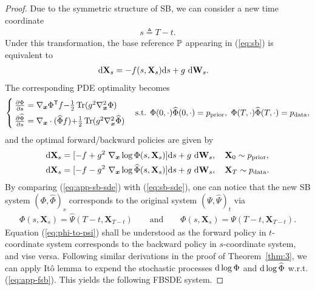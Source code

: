 \documentclass{article}
\def\eqref#1{(\ref{#1})}
\def\rd{{\textnormal{d}}}
\def\rvX{{\mathbf{X}}}
\def\vx{{\bm{x}}}
\newcommand{\pdata}{p_{\rm{data}}}
\DeclareMathOperator{\Tr}{Tr}
\def\ws{{ \mathbf{W}_s }}
\def\dws{{ \mathrm{d} \ws }}
\def\ds{{ \mathrm{d} s }}
\newcommand{\fracpartial}[2]{\frac{\partial #1}{\partial  #2}}
\newcommand{\T}{\mathsf{T}}
\begin{document}
\begin{proof}
  Due to the symmetric structure of SB, we can consider a new time coordinate
  \begin{align*}
    s \triangleq T - t.
  \end{align*}
  Under this transformation, the base reference ${\mathbb{P}}$ appearing in \eqref{eq:sb} is equivalent to
  \begin{align*}
    \rd \rvX_s &= - f(s, \rvX_s) \ds + g~\dws.
  \end{align*}
  The corresponding PDE optimality becomes
  \begin{align}
      \begin{cases}
      \fracpartial{\Phi}{s} = \nabla_\vx \Phi^\T f {-} \frac{1}{2} \Tr(g^2\nabla^2_{\vx}\Phi) \\[3pt]
      \fracpartial{\widehat{\Phi}}{s} = \nabla_\vx \cdot (\widehat{\Phi} f) {+} \frac{1}{2} \Tr(g^2\nabla^2_{\vx}\widehat{\Phi})
      \end{cases}
      \text{s.t. } \Phi(0,\cdot) \widehat{\Phi}(0,\cdot) = \prior,~\Phi(T,\cdot) \widehat{\Phi}(T,\cdot) = \pdata,
  \end{align}
  and the optimal forward/backward policies are given by
  \begin{subequations}
  \begin{align}
      \rd \rvX_s &= [-f + g^2~\nabla_\vx \log {\Phi}(s,\rvX_s)] \ds + g~\dws,
      \quad \rvX_0 \sim \prior,
      \label{eq:app-fsb}
      \\
      \rd \rvX_s &= [- f - g^2~\nabla_\vx \log \widehat{\Phi}(s,\rvX_s)] \ds + g~\dws,
      \quad \rvX_T \sim \pdata.
      \label{eq:app-bsb}
  \end{align} \label{eq:app-sb-sde}\end{subequations}
  By comparing \eqref{eq:app-sb-sde} with \eqref{eq:sb-sde},
  one can notice that the new SB system $(\Phi, \widehat{\Phi})_s$ corresponds to the original system
  $(\Psi, \widehat{\Psi})_t$ via
  \begin{align}
    \Phi(s, \rvX_s) = \widehat{\Psi}(T-t, \rvX_{T-t}) \qquad \text{and} \qquad
    \widehat{\Phi}(s, \rvX_s) = {\Psi}(T-t, \rvX_{T-t}).
    \label{eq:phi-to-psi}
  \end{align}
  Equation \eqref{eq:phi-to-psi} shall be understood as the forward policy in $t$-coordinate system corresponds to
  the backward policy in $s$-coordinate system, and vise versa.
  Following similar derivations in the proof of Theorem~\ref{thm:3},
  we can apply It{\^o} lemma to expend the stochastic processes $\rd \log \Phi$ and $\rd \log \widehat{\Phi}$ w.r.t. \eqref{eq:app-fsb}. This yields the following FBSDE system.

\end{proof}
\end{document}
